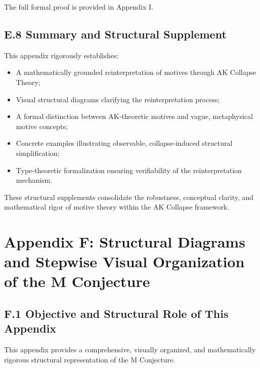 \documentclass[11pt]{article}
\begin{document}
The full formal proof is provided in Appendix I.

\subsection*{E.8 Summary and Structural Supplement}

This appendix rigorously establishes:

\begin{itemize}
    \item A mathematically grounded reinterpretation of motives through AK Collapse Theory;
    \item Visual structural diagrams clarifying the reinterpretation process;
    \item A formal distinction between AK-theoretic motives and vague, metaphysical motive concepts;
    \item Concrete examples illustrating observable, collapse-induced structural simplification;
    \item Type-theoretic formalization ensuring verifiability of the reinterpretation mechanism.
\end{itemize}

These structural supplements consolidate the robustness, conceptual clarity, and mathematical rigor of motive theory within the AK Collapse framework.

\FloatBarrier




\section*{Appendix F: Structural Diagrams and Stepwise Visual Organization of the M Conjecture}

\subsection*{F.1 Objective and Structural Role of This Appendix}

This appendix provides a comprehensive, visually organized, and mathematically rigorous structural representation of the M Conjecture.
\end{document}

